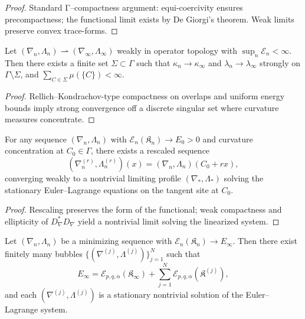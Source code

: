 \begin{proof}
Standard Γ–compactness argument: equi-coercivity ensures precompactness; the functional limit exists by De Giorgi’s theorem. Weak limits preserve convex trace-forms. \relax
\end{proof}

\begin{lemma}\label{lem:defect}
Let $(\nabla_n,\Lambda_n)\rightharpoonup(\nabla_\infty,\Lambda_\infty)$ weakly in operator topology with $\sup_n\mathcal E_n<\infty$. 
Then there exists a finite set $\Sigma\subset\Gamma$ such that 
$\kappa_n\to\kappa_\infty$ and $\lambda_n\to\lambda_\infty$ strongly on $\Gamma\setminus\Sigma$,
and $\sum_{C\in\Sigma}\mu(\{C\})<\infty$.
\end{lemma}

\begin{proof}
Rellich–Kondrachov-type compactness on overlaps and uniform energy bounds imply strong convergence off a discrete singular set where curvature measures concentrate. \relax
\end{proof}


\begin{proposition}\label{prop:blowup}
For any sequence $(\nabla_n,\Lambda_n)$ with $\mathcal E_n(\mathfrak K_n)\to E_0>0$ and curvature concentration at $C_0\in\Gamma$, there exists a rescaled sequence
\[
(\nabla_n^{(r)},\Lambda_n^{(r)})(x)=
(\nabla_n,\Lambda_n)(C_0+r x),
\]
converging weakly to a nontrivial limiting profile $(\nabla_\ast,\Lambda_\ast)$ solving the stationary Euler–Lagrange equations on the tangent site at $C_0$.
\end{proposition}

\begin{proof}
Rescaling preserves the form of the functional; weak compactness and ellipticity of $D_\nabla^*D_\nabla$ yield a nontrivial limit solving the linearized system. \relax
\end{proof}


\begin{theorem}\label{thm:energy-quantization}
Let $(\nabla_n,\Lambda_n)$ be a minimizing sequence with $\mathcal E_n(\mathfrak K_n)\to E_\infty$.
Then there exist finitely many bubbles $\{(\nabla^{(j)},\Lambda^{(j)})\}_{j=1}^N$ such that
\[
E_\infty=\mathcal E_{p,q,\alpha}(\mathfrak K_\infty)+\sum_{j=1}^N\mathcal E_{p,q,\alpha}(\mathfrak K^{(j)}),
\]
and each $(\nabla^{(j)},\Lambda^{(j)})$ is a stationary nontrivial solution of the Euler–Lagrange system.
\end{theorem}

